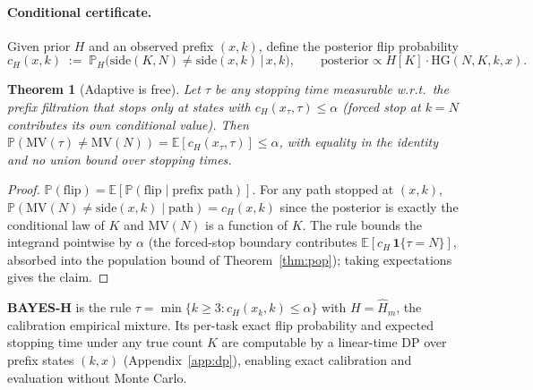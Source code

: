 \documentclass{article}
\newtheorem{theorem}{Theorem}
\theoremstyle{definition}
\theoremstyle{remark}
\newcommand{\flip}{\mathrm{flip}}
\newcommand{\cert}{c_H}
\newcommand{\HG}{\mathrm{HG}}
\newcommand{\MV}{\mathrm{MV}}
\newcommand{\E}{\mathbb{E}}
\renewcommand{\P}{\mathbb{P}}
\begin{document}
\paragraph{Conditional certificate.}
Given prior $H$ and an observed prefix $(x,k)$, define the posterior flip
probability
\begin{equation}
\cert(x,k) \;:=\; \P_H\big(\mathrm{side}(K,N)\neq\mathrm{side}(x,k)\,\big|\,x,k\big),
\qquad \text{posterior} \propto H[K]\cdot\HG(N,K,k,x).
\label{eq:cond}
\end{equation}

\begin{theorem}[Adaptive is free]
\label{thm:tower}
Let $\tau$ be any stopping time measurable w.r.t.\ the prefix filtration that
stops only at states with $\cert(x_\tau,\tau)\le\alpha$ (forced stop at
$k=N$ contributes its own conditional value). Then
$\P(\MV(\tau)\neq\MV(N)) = \E[\cert(x_\tau,\tau)] \le \alpha$,
with equality in the identity and no union bound over stopping times.
\end{theorem}
\begin{proof}
$\P(\flip)=\E[\P(\flip\mid\text{prefix path})]$. For any path stopped at
$(x,k)$, $\P(\MV(N)\neq\mathrm{side}(x,k)\mid\text{path})=\cert(x,k)$ since
the posterior is exactly the conditional law of $K$ and $\MV(N)$ is a
function of $K$. The rule bounds the integrand pointwise by $\alpha$ (the
forced-stop boundary contributes $\E[\cert\,\mathbf{1}\{\tau=N\}]$, absorbed
into the population bound of Theorem~\ref{thm:pop}); taking expectations
gives the claim.
\end{proof}

\textbf{BAYES-H} is the rule $\tau=\min\{k\ge 3:\cert(x_k,k)\le\alpha\}$ with
$H=\widehat H_m$, the calibration empirical mixture. Its per-task exact flip
probability and expected stopping time under any true count $K$ are computable
by a linear-time DP over prefix states $(k,x)$ (Appendix~\ref{app:dp}),
enabling exact calibration and evaluation without Monte Carlo.
\end{document}
